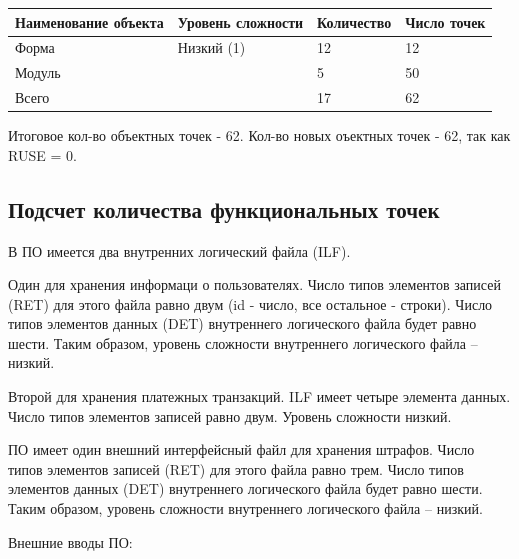 \documentclass[a4paper,14pt]{article}
\begin{document}
\begin{table}[H]
\begin{tabular}{|l|l|l|l|}
\hline
Наименование объекта & Уровень сложности & Количество & Число точек \\ \hline
Форма                & Низкий (1)        & 12          & 12           \\ \hline
Модуль               &                   & 5          & 50          \\ \hline
Всего                &                   & 17         & 62          \\ \hline
\end{tabular}
\end{table}

Итоговое кол-во объектных точек - 62. Кол-во новых оъектных точек - 62, так как RUSE = 0.

\subsection*{Подсчет количества функциональных точек}

В  ПО имеется  два  внутренних  логический  файла  (ILF). 

Один для хранения  информаци о пользователях. Число типов элементов записей (RET) для этого файла равно двум (id - число, все остальное - строки). Число  типов  элементов  данных  (DET)  внутреннего  логического файла  будет  равно шести. Таким  образом,  уровень  сложности  внутреннего логического файла – низкий.

Второй для хранения  платежных транзакций. ILF имеет четыре элемента данных. Число типов элементов записей равно двум. Уровень сложности низкий.

ПО имеет один внешний интерфейсный файл для хранения штрафов. Число типов элементов записей (RET) для этого файла равно трем. Число  типов  элементов  данных  (DET)  внутреннего  логического файла  будет  равно шести. Таким  образом,  уровень  сложности  внутреннего логического файла – низкий.

Внешние вводы ПО:
\end{document}
